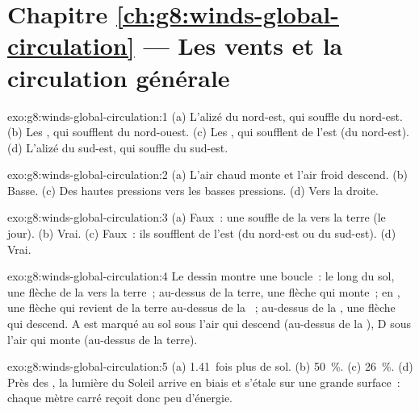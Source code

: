 \section*{Chapitre \ref{ch:g8:winds-global-circulation} --- Les vents et la circulation générale}

\begin{solution}{exo:g8:winds-global-circulation:1}
(a) L'alizé du nord-est, qui souffle du nord-est. (b) Les ,
qui soufflent du nord-ouest. (c) Les , qui soufflent
de l'est (du nord-est). (d) L'alizé du sud-est, qui souffle du sud-est.
\end{solution}

\begin{solution}{exo:g8:winds-global-circulation:2}
(a) L'air chaud monte et l'air froid descend. (b) Basse. (c) Des hautes
pressions vers les basses pressions. (d) Vers la droite.
\end{solution}

\begin{solution}{exo:g8:winds-global-circulation:3}
(a) Faux~: une  souffle de la  vers la terre (le jour).
(b) Vrai. (c) Faux~: ils soufflent de l'est (du nord-est ou du sud-est).
(d) Vrai.
\end{solution}

\begin{solution}{exo:g8:winds-global-circulation:4}
Le dessin montre une boucle~: le long du sol, une flèche de la  vers la
terre~; au-dessus de la terre, une flèche qui monte~; en , une
flèche qui revient de la terre au-dessus de la ~; au-dessus de la ,
une flèche qui descend. A est marqué au sol sous l'air qui descend
(au-dessus de la ), D sous l'air qui monte (au-dessus de la terre).
\end{solution}

\begin{solution}{exo:g8:winds-global-circulation:5}
(a) 1.41~fois plus de sol. (b) 50~\%. (c) 26~\%. (d) Près des , la
lumière du Soleil arrive en biais et s'étale sur une grande surface~:
chaque mètre carré reçoit donc peu d'énergie.
\end{solution}

